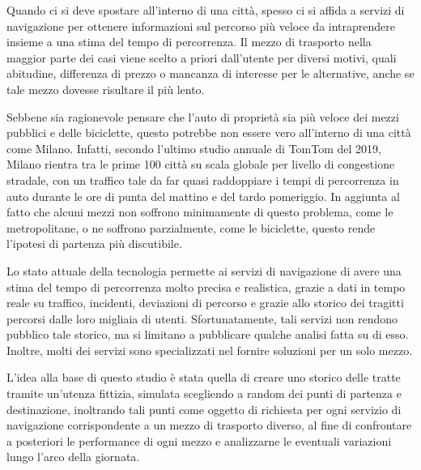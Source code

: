 Quando ci si deve spostare all'interno di una città, spesso ci si affida a servizi di navigazione per ottenere informazioni sul percorso più veloce da intraprendere insieme a una stima del tempo di percorrenza.
Il mezzo di trasporto nella maggior parte dei casi viene scelto a priori dall'utente per diversi motivi, quali abitudine, differenza di prezzo o mancanza di interesse per le alternative, anche se tale mezzo dovesse risultare il più lento.

Sebbene sia ragionevole pensare che l'auto di proprietà sia più veloce dei mezzi pubblici e delle biciclette, questo potrebbe non essere vero all'interno di una città come Milano. Infatti, secondo l'ultimo studio annuale di TomTom del 2019\cite{tomtomindexmilan}, Milano rientra tra le prime 100 città su scala globale per livello di congestione stradale, con un traffico tale da far quasi raddoppiare i tempi di percorrenza in auto durante le ore di punta del mattino e del tardo pomeriggio. In aggiunta al fatto che alcuni mezzi non soffrono minimamente di questo problema, come le metropolitane, o ne soffrono parzialmente, come le biciclette, questo rende l'ipotesi di partenza più discutibile.

Lo stato attuale della tecnologia permette ai servizi di navigazione di avere una stima del tempo di percorrenza molto precisa e realistica, grazie a dati in tempo reale su traffico, incidenti, deviazioni di percorso e grazie allo storico dei tragitti percorsi dalle loro migliaia di utenti. Sfortunatamente, tali servizi non rendono pubblico tale storico, ma si limitano a pubblicare qualche analisi fatta su di esso. Inoltre, molti dei servizi sono specializzati nel fornire soluzioni per un solo mezzo.

\cite{croci2014}

\cite{rotaris2010}

\cite{rotaris2019}

\cite{meinardi2008}


L'idea alla base di questo studio è stata quella di creare uno storico delle tratte tramite un'utenza fittizia, simulata scegliendo a random dei punti di partenza e destinazione, inoltrando tali punti come oggetto di richiesta per ogni servizio di navigazione corrispondente a un mezzo di trasporto diverso, al fine di confrontare a posteriori le performance di ogni mezzo e analizzarne le eventuali variazioni lungo l'arco della giornata.